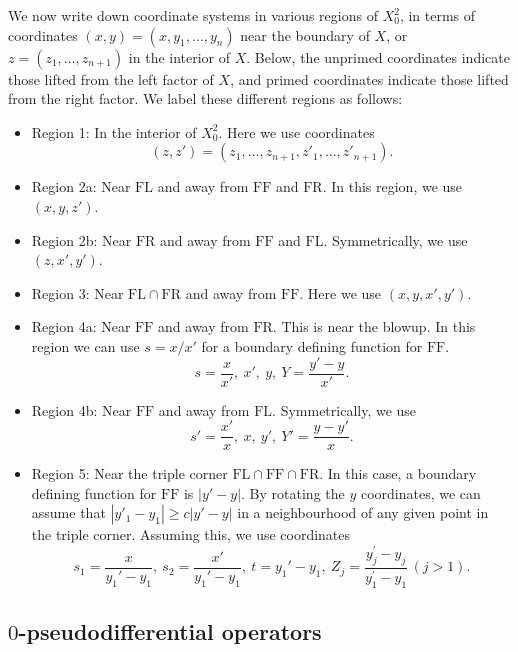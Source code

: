 \documentclass[10pt, a4paper, twoside]{amsart}
\numberwithin{equation}{section}
\theoremstyle{remark}
\begin{document}
We now write down coordinate systems in various regions of $X^2_0$, in terms of coordinates $(x,y) = (x, y_1, \dots, y_n)$ near the boundary of $X$, or $z = (z_1, \dots, z_{n+1})$ in the interior of $X$.  
Below, the unprimed coordinates indicate those lifted from the left factor of $X$, and primed coordinates indicate those lifted from the right factor. 
We label these different regions as follows:
\begin{itemize}
\item{Region 1:} In the interior of $X^2_0$. Here we use coordinates $$(z, z') = (z_1, \dots, z_{n+1}, z'_1, \dots, z'_{n+1}).$$ 

\item{Region 2a:} Near ${\mathrm{FL}}$ and away from ${\mathrm{FF}}$ and ${\mathrm{FR}}$. 
In this region, we use $(x, y, z')$. 
\item{Region 2b:} Near ${\mathrm{FR}}$ and away from ${\mathrm{FF}}$ and ${\mathrm{FL}}$. 
Symmetrically,  we use $(z, x', y')$. 

\item{Region 3:} Near ${\mathrm{FL}} \cap {\mathrm{FR}}$ and away from ${\mathrm{FF}}$. 
Here we use $(x, y, x', y')$. 

\item{Region 4a:} Near ${\mathrm{FF}}$ and away from ${\mathrm{FR}}$.
This is near the blowup. In this region we can use $s = x/x'$ for a boundary defining function for ${\mathrm{FF}}$. 
$$
s = \frac{x}{x'}, \ x', \ y, \ Y = \frac{y' - y}{x'}. 
$$
\item{Region 4b:} Near ${\mathrm{FF}}$ and away from ${\mathrm{FL}}$.
Symmetrically, we use 
$$
s' = \frac{x'}{x}, \ x, \ y', \ Y' = \frac{y - y'}{x}. 
$$
\item{Region 5:} Near the triple corner ${\mathrm{FL}} \cap {\mathrm{FF}} \cap {\mathrm{FR}}$.
In this case, a boundary defining function for ${\mathrm{FF}}$ is $|y'-y|$. By rotating the $y$ coordinates, we can assume that $|y'_1 - y_1| \geq c |y' - y|$ in a neighbourhood of any given point in the triple corner. Assuming this, we use coordinates
$$
s_1 = \frac{x}{y_1' - y_1}, \ s_2 = \frac{x'}{y_1' - y_1}, \ t = y_1' - y_1, \ Z_j = \frac{y_j^\prime - y_j}{y_1^\prime - y_1} \, (j > 1).
$$
\end{itemize}

\subsection{$0$-pseudodifferential operators}
\end{document}
